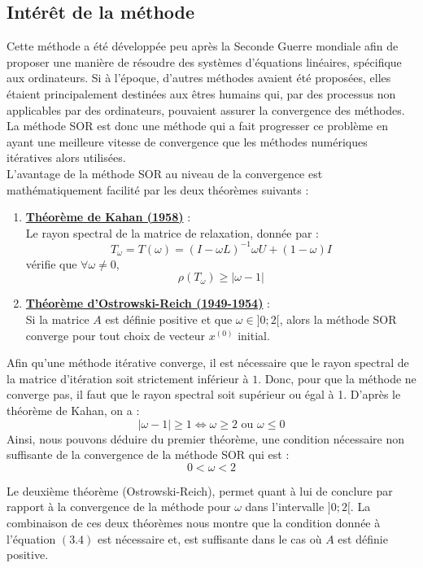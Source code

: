 \subsection{Intérêt de la méthode}
Cette méthode a été développée peu après la Seconde Guerre mondiale afin de proposer une manière de résoudre des systèmes d'équations linéaires, spécifique aux ordinateurs. Si à l'époque, d'autres méthodes avaient été proposées, elles étaient principalement destinées aux êtres humains qui, par des processus non applicables par des ordinateurs, pouvaient assurer la convergence des méthodes. La méthode SOR est donc une méthode qui a fait progresser ce problème en ayant une meilleure vitesse de convergence que les méthodes numériques itératives alors utilisées.\\

L'avantage de la méthode SOR au niveau de la convergence est mathématiquement facilité par les deux théorèmes suivants :
\begin{enumerate}
	\item \textbf{\underline{Théorème de Kahan (1958)}} :\\ 
	\indent \indent Le rayon spectral de la matrice de relaxation, donnée par :
	$$
	T_\omega=T(\omega)=(I-\omega L)^{-1}{\omega U +(1-\omega)I}
	$$
	vérifie que $\forall \omega \neq 0$,
	$$
	\rho(T_\omega)\geq|\omega -1|
	$$
	\item \textbf{\underline{Théorème d'Ostrowski-Reich (1949-1954)}} :\\ 
	\indent \indent Si la matrice $A$ est définie positive et que $\omega \in ]0;2[$, alors la méthode SOR converge pour tout choix de vecteur $x^{(0)}$ initial.
\end{enumerate}

Afin qu'une méthode itérative converge, il est nécessaire que le rayon spectral de la matrice d'itération soit strictement inférieur à $1$. Donc, pour que la méthode ne converge pas, il faut que le rayon spectral soit supérieur ou égal à 1. D'après le théorème de Kahan, on a :
$$
|\omega -1|\geq 1 \Leftrightarrow \omega \geq 2 \text{ ou } \omega \leq 0 
$$
Ainsi, nous pouvons déduire du premier théorème, une condition nécessaire non suffisante de la convergence de la méthode SOR qui est :
\begin{equation}
0<\omega<2
\end{equation}

Le deuxième théorème (Ostrowski-Reich), permet quant à lui de conclure par rapport à la convergence de la méthode pour $\omega$ dans l'intervalle $]0;2[$. La combinaison de ces deux théorèmes nous montre que la condition donnée à l'équation $(3.4)$ est nécessaire et, est suffisante dans le cas où $A$ est définie positive.\\

